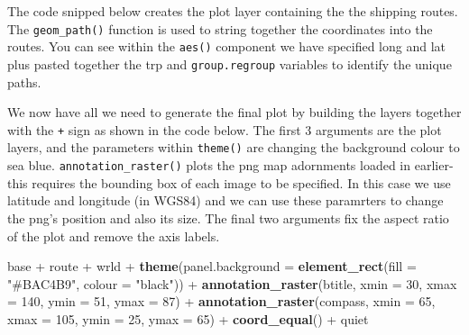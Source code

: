\documentclass[]{article}
\newenvironment{Shaded}{}{}
\newcommand{\KeywordTok}[1]{\textcolor[rgb]{0.00,0.44,0.13}{\textbf{{#1}}}}
\newcommand{\DataTypeTok}[1]{\textcolor[rgb]{0.56,0.13,0.00}{{#1}}}
\newcommand{\DecValTok}[1]{\textcolor[rgb]{0.25,0.63,0.44}{{#1}}}
\newcommand{\FloatTok}[1]{\textcolor[rgb]{0.25,0.63,0.44}{{#1}}}
\newcommand{\StringTok}[1]{\textcolor[rgb]{0.25,0.44,0.63}{{#1}}}
\newcommand{\NormalTok}[1]{{#1}}
\begin{document}
The code snipped below creates the plot layer containing the the
shipping routes. The \texttt{geom\_path()} function is used to string
together the coordinates into the routes. You can see within the
\texttt{aes()} component we have specified long and lat plus pasted
together the trp and \texttt{group.regroup} variables to identify the
unique paths.

\begin{Shaded}
\end{Shaded}

We now have all we need to generate the final plot by building the
layers together with the \texttt{+} sign as shown in the code below. The
first 3 arguments are the plot layers, and the parameters within
\texttt{theme()} are changing the background colour to sea blue.
\texttt{annotation\_raster()} plots the png map adornments loaded in
earlier- this requires the bounding box of each image to be specified.
In this case we use latitude and longitude (in WGS84) and we can use
these paramrters to change the png's position and also its size. The
final two arguments fix the aspect ratio of the plot and remove the axis
labels.

\begin{Shaded}
\begin{Highlighting}[]
\NormalTok{base + route + wrld + }\KeywordTok{theme}\NormalTok{(}\DataTypeTok{panel.background =} \KeywordTok{element_rect}\NormalTok{(}\DataTypeTok{fill =} \StringTok{"#BAC4B9"}\NormalTok{, }
    \DataTypeTok{colour =} \StringTok{"black"}\NormalTok{)) + }\KeywordTok{annotation_raster}\NormalTok{(btitle, }\DataTypeTok{xmin =} \DecValTok{30}\NormalTok{, }\DataTypeTok{xmax =} \DecValTok{140}\NormalTok{, }\DataTypeTok{ymin =} \DecValTok{51}\NormalTok{, }
    \DataTypeTok{ymax =} \DecValTok{87}\NormalTok{) + }\KeywordTok{annotation_raster}\NormalTok{(compass, }\DataTypeTok{xmin =} \DecValTok{65}\NormalTok{, }\DataTypeTok{xmax =} \DecValTok{105}\NormalTok{, }\DataTypeTok{ymin =} \DecValTok{25}\NormalTok{, }
    \DataTypeTok{ymax =} \DecValTok{65}\NormalTok{) + }\KeywordTok{coord_equal}\NormalTok{() + quiet}
\end{Highlighting}
\end{Shaded}
\end{document}
